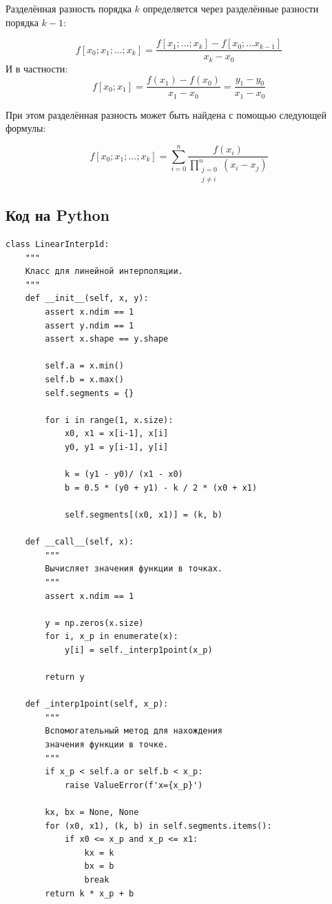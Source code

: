 \documentclass[12pt]{article}%
\begin{document}
Разделённая разность порядка $k$ определяется через разделённые разности порядка $k - 1$:

\[
f[x_0; x_1; \dots; x_k] = 
\frac{f[x_1; \dots; x_k] - f[x_0; \dots x_{k-1}]}{x_k - x_0}
\]
И в частности:
\[
f[x_0; x_1] = \frac{f(x_1) - f(x_0)}{x_1 - x_0} = 
\frac{y_1 - y_0}{x_1 - x_0}
\]

При этом разделённая разность может быть найдена с помощью следующей формулы:

\[
f[x_0; x_1; \dots; x_k] = \sum\limits_{i = 0}^{n}
\frac{f(x_i)}{
\prod\limits_{\substack{j = 0 \\ j \ne i}}^n(x_i - x_j)
}
\]
\newpage
\subsection{Код на Python}
\begin{verbatim}
class LinearInterp1d:
    """
    Класс для линейной интерполяции.
    """
    def __init__(self, x, y):
        assert x.ndim == 1
        assert y.ndim == 1
        assert x.shape == y.shape
        
        self.a = x.min()
        self.b = x.max()
        self.segments = {}

        for i in range(1, x.size):
            x0, x1 = x[i-1], x[i]
            y0, y1 = y[i-1], y[i]
            
            k = (y1 - y0)/ (x1 - x0)
            b = 0.5 * (y0 + y1) - k / 2 * (x0 + x1)

            self.segments[(x0, x1)] = (k, b)

    def __call__(self, x):
        """
        Вычисляет значения функции в точках.
        """
        assert x.ndim == 1
        
        y = np.zeros(x.size)
        for i, x_p in enumerate(x):
            y[i] = self._interp1point(x_p)

        return y

    def _interp1point(self, x_p):
        """
        Вспомогательный метод для нахождения 
        значения функции в точке.
        """
        if x_p < self.a or self.b < x_p:
            raise ValueError(f'x={x_p}')

        kx, bx = None, None
        for (x0, x1), (k, b) in self.segments.items():
            if x0 <= x_p and x_p <= x1:
                kx = k
                bx = b
                break
        return k * x_p + b
\end{verbatim}
\end{document}
